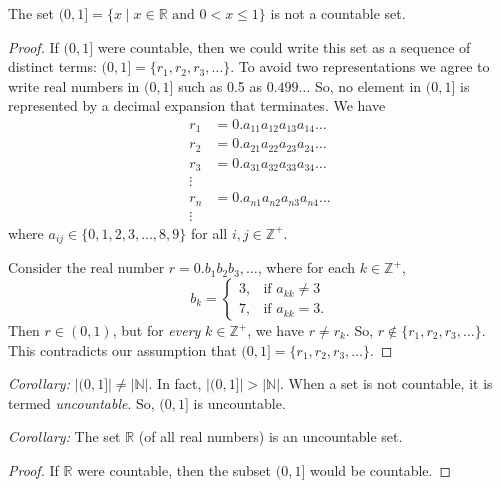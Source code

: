 \documentclass[11pt]{article}
\begin{document}
    The set \((0,1] = \{x \mid x \in \mathbb{R} \text{ and } 0 < x \leq 1\}\) is not a countable set. 
    \begin{proof}
        If \((0,1]\) were countable, then we could write this set as a sequence of distinct terms: \((0,1] = \{r_1, r_2, r_3, \dots\}\). To avoid two representations we agree to write real numbers in \((0,1]\) such as 0.5 as \(0.499\dots\) So, no element in \((0,1]\) is represented by a decimal expansion that terminates. We have 
        \begin{align*}
            r_1 &= 0.a_{11} a_{12} a_{13} a_{14} \dots \\
            r_2 &= 0.a_{21} a_{22} a_{23} a_{24} \dots \\
            r_3 &= 0.a_{31} a_{32} a_{33} a_{34} \dots \\
            \vdots & \\
            r_n &=  0.a_{n1} a_{n2} a_{n3} a_{n4} \dots \\
            \vdots &
        \end{align*}
        where \(a_{ij} \in \{0,1,2,3,\dots, 8, 9\}\) for all \(i,j \in \mathbb{Z}^+\). 

        Consider the real number \(r = 0.b_1 b_2 b_3, \dots\), where for each \(k \in \mathbb{Z}^+\),
        \begin{equation*}
            b_k = \begin{cases}
                3, & \text{if } a_{kk} \neq 3 \\
                7, & \text{if } a_{kk} = 3.
            \end{cases}
        \end{equation*}
        Then \(r \in (0,1)\), but for \emph{every} \(k \in \mathbb{Z}^+\), we have \(r \neq r_k\). So, \(r \notin \{r_1, r_2, r_3, \dots\}\). This contradicts our assumption that \((0,1] = \{r_1, r_2, r_3, \dots\}\).
    \end{proof}

    \emph{Corollary:} \(|(0,1]| \neq |\mathbb{N}|\). In fact, \(|(0,1]| > |\mathbb{N}|\). When a set is not countable, it is termed \emph{uncountable}. So, \((0,1]\) is uncountable.

    \vspace{1em}

    \emph{Corollary:} The set \(\mathbb{R}\) (of all real numbers) is an uncountable set.
    \begin{proof}
        If \(\mathbb{R}\) were countable, then the subset \((0,1]\) would be countable.
    \end{proof}
    
\end{document}
